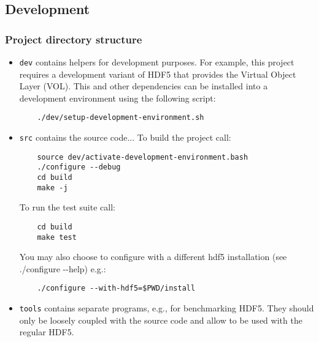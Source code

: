 \subsection{Development}%
\label{development}

\subsubsection{Project directory structure}%
\label{project-directory-structure}

\begin{itemize}
  \item \texttt{dev} contains helpers for development purposes. For example,
    this project requires a development variant of HDF5 that provides the
    Virtual Object Layer (VOL). This and other dependencies can be
    installed into a development environment using the following script:

    \begin{lstlisting}
    ./dev/setup-development-environment.sh
    \end{lstlisting}
  \item \texttt{src} contains the source code... To build the project call:

    \begin{lstlisting}
    source dev/activate-development-environment.bash
    ./configure --debug
    cd build
    make -j
    \end{lstlisting}

    To run the test suite call:

    \begin{lstlisting}
    cd build
    make test
    \end{lstlisting}

    You may also choose to configure with a different hdf5 installation
    (see ./configure -\/-help) e.g.:

    \begin{lstlisting}
    ./configure --with-hdf5=$PWD/install
    \end{lstlisting}




  \item \texttt{tools} contains separate programs, e.g., for benchmarking
    HDF5. They should only be loosely coupled with the source code and
    allow to be used with the regular HDF5.
\end{itemize}
